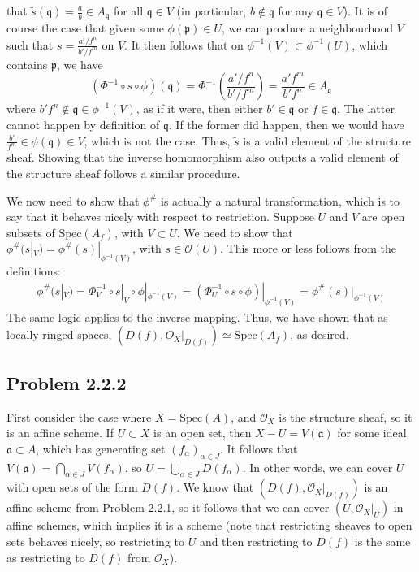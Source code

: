 \documentclass[aps,pra,showpacs,notitlepage,onecolumn,superscriptaddress,nofootinbib]{revtex4-1}
\theoremstyle{definition}
\begin{document}
  that $\widetilde{s}(\mathfrak{q}) = \frac{a}{b} \in A_{\mathfrak{q}}$ for all $\mathfrak{q} \in V$ (in particular, $b \notin \mathfrak{q}$ for any $\mathfrak{q} \in V$).  It is of course the case
  that given some $\phi(\mathfrak{p}) \in U$, we can produce a neighbourhood $V$ such that $s = \frac{a'/f^n}{b'/f^m}$ on $V$. It then follows that on $\phi^{-1}(V) \subset \phi^{-1}(U)$, which
  contains $\mathfrak{p}$, we have
  \begin{equation}
    (\Phi^{-1} \circ s \circ \phi)(\mathfrak{q}) = \Phi^{-1} \left( \frac{a'/f^n}{b'/f^m} \right) = \frac{a' f^m}{b' f^n} \in A_{\mathfrak{q}}
  \end{equation}
  where $b' f^n \notin \mathfrak{q} \in \phi^{-1}(V)$, as if it were, then either $b' \in \mathfrak{q}$ or $f \in \mathfrak{q}$. The latter cannot happen by definition of $\mathfrak{q}$. If the former did happen, then
  we would have $\frac{b'}{f^m} \in \phi(\mathfrak{q}) \in V$, which is not the case. Thus, $\widetilde{s}$ is a valid element of the structure sheaf. Showing that the inverse homomorphism
  also outputs a valid element of the structure sheaf follows a similar procedure.
  \newline

  \noindent We now need to show that $\phi^{\#}$ is actually a natural transformation, which is to say that it behaves nicely with respect to restriction. Suppose $U$ and $V$ are open
  subsets of $\text{Spec}(A_f)$, with $V \subset U$. We need to show that $\phi^{\#}(s|_V) = \phi^{\#}(s)|_{\phi^{-1}(V)}$, with $s \in \mathcal{O}(U)$. This more or less follows from the
  definitions:
  \begin{align}
    \phi^{\#}(s|_V) = \Phi^{-1}_V \circ s|_V \circ \phi|_{\phi^{-1}(V)} = (\Phi^{-1}_U \circ s \circ \phi)|_{\phi^{-1}(V)} = \phi^{\#}(s)|_{\phi^{-1}(V)}
    \end{align}
  The same logic applies to the inverse mapping. Thus, we have shown that as locally ringed spaces, $(D(f), O_X|_{D(f)}) \simeq \text{Spec}(A_f)$, as desired.

\subsection{Problem 2.2.2}

\noindent First consider the case where $X = \text{Spec}(A)$, and $\mathcal{O}_X$ is the structure sheaf, so it is an affine scheme. If $U \subset X$ is an open set, then $X - U = V(\mathfrak{a})$ for some
  ideal $\mathfrak{a} \subset A$, which has generating set $(f_{\alpha})_{\alpha \in J}$. It follows that $V(\mathfrak{a}) = \bigcap_{\alpha \in J} V(f_{\alpha})$, so $U = \bigcup_{\alpha \in J} D(f_{\alpha})$.
  In other words, we can cover $U$ with open sets of the form $D(f)$. We know that $(D(f), \mathcal{O}_X|_{D(f)})$ is an affine scheme from Problem 2.2.1, so it follows that we can cover $(U, \mathcal{O}_X|_U)$ in affine
  schemes, which implies it is a scheme (note that restricting sheaves to open sets behaves nicely, so restricting to $U$ and then restricting to $D(f)$ is the same as restricting to $D(f)$ from $\mathcal{O}_X$).
\end{document}
